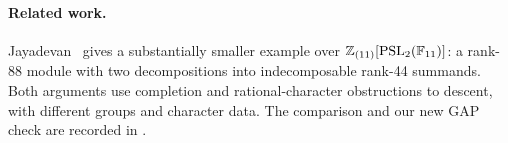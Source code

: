 
\paragraph{Related work.}
Jayadevan~\cite{jayadevan-4-55} gives a substantially smaller example
over \(\mathbb Z_{(11)}[\operatorname{PSL}_2(\mathbb F_{11})]\): a rank-88 module
with two decompositions into indecomposable rank-44 summands. Both
arguments use completion and rational-character obstructions to descent,
with different groups and character data. The comparison and our new
GAP check are recorded in \comparisonlocation{}.
